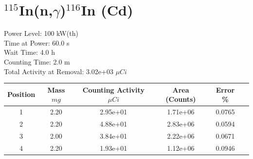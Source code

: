 \newpage

\section*{ $^{115}$In(n,$\gamma$)$^{116}$In (Cd) }

Power Level: 100 kW(th) \\
Time at Power: 60.0 s \\
Wait Time:  4.0 h \\
Counting Time:  2.0 m \\
Total Activity at Removal: 3.02e+03 $\mu Ci$

\begin{table}[h]
\centering
\begin{tabular}{ |c|c|c|c|c|c| }
 \hline
 Position & Mass $mg$ & Counting Activity $\mu Ci$ & Area (Counts) & Error \% \\
 \hline 
 1 & 2.20 & 2.95e+01 & 1.71e+06 & 0.0765 \\ 
\hline
 2 & 2.20 & 4.88e+01 & 2.83e+06 & 0.0594 \\ 
\hline
 3 & 2.00 & 3.84e+01 & 2.22e+06 & 0.0671 \\ 
\hline
 4 & 2.20 & 1.93e+01 & 1.12e+06 & 0.0946 \\ 
\hline
\end{tabular}
\end{table}

